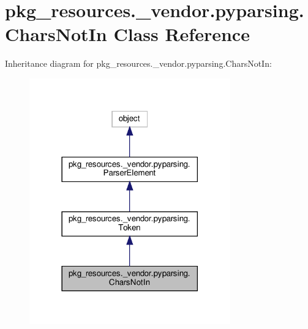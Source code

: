 \hypertarget{classpkg__resources_1_1__vendor_1_1pyparsing_1_1CharsNotIn}{}\section{pkg\+\_\+resources.\+\_\+vendor.\+pyparsing.\+Chars\+Not\+In Class Reference}
\label{classpkg__resources_1_1__vendor_1_1pyparsing_1_1CharsNotIn}


Inheritance diagram for pkg\+\_\+resources.\+\_\+vendor.\+pyparsing.\+Chars\+Not\+In\+:
\nopagebreak
\begin{figure}[H]
\begin{center}
\leavevmode
\includegraphics[width=246pt]{classpkg__resources_1_1__vendor_1_1pyparsing_1_1CharsNotIn__inherit__graph}
\end{center}
\end{figure}


